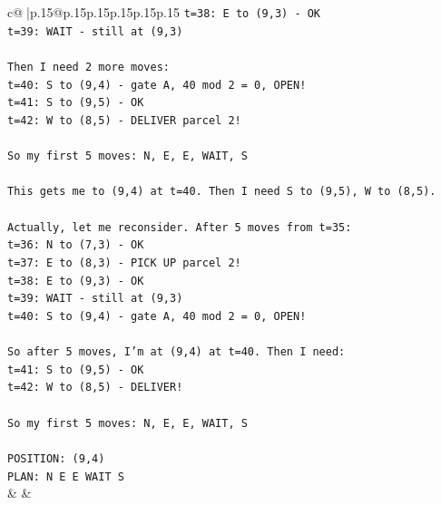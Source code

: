 \documentclass{article}
\begin{document}
{\begin{supertabular}{c@{$\;$}|p{.15\linewidth}@{}p{.15\linewidth}p{.15\linewidth}p{.15\linewidth}p{.15\linewidth}p{.15\linewidth}}
{{{\texttt{t=38: E to (9,3) {-} OK} \\
\texttt{t=39: WAIT {-} still at (9,3)} \\
\\ 
\texttt{Then I need 2 more moves:} \\
\texttt{t=40: S to (9,4) {-} gate A, 40 mod 2 = 0, OPEN!} \\
\texttt{t=41: S to (9,5) {-} OK} \\
\texttt{t=42: W to (8,5) {-} DELIVER parcel 2!} \\
\\ 
\texttt{So my first 5 moves: N, E, E, WAIT, S} \\
\\ 
\texttt{This gets me to (9,4) at t=40. Then I need S to (9,5), W to (8,5).} \\
\\ 
\texttt{Actually, let me reconsider. After 5 moves from t=35:} \\
\texttt{t=36: N to (7,3) {-} OK} \\
\texttt{t=37: E to (8,3) {-} PICK UP parcel 2!} \\
\texttt{t=38: E to (9,3) {-} OK} \\
\texttt{t=39: WAIT {-} still at (9,3)} \\
\texttt{t=40: S to (9,4) {-} gate A, 40 mod 2 = 0, OPEN!} \\
\\ 
\texttt{So after 5 moves, I'm at (9,4) at t=40. Then I need:} \\
\texttt{t=41: S to (9,5) {-} OK} \\
\texttt{t=42: W to (8,5) {-} DELIVER!} \\
\\ 
\texttt{So my first 5 moves: N, E, E, WAIT, S} \\
\\ 
\texttt{POSITION: (9,4)} \\
\texttt{PLAN: N E E WAIT S} \\
            }
        }
    }
    & & \\ \\


\end{supertabular}}
\end{document}
